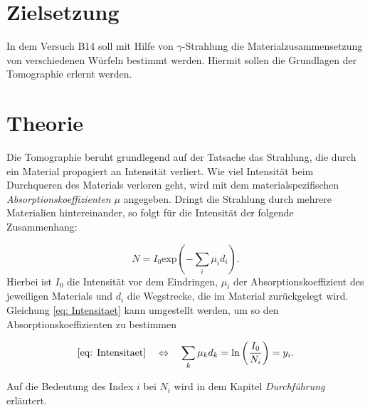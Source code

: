 \setcounter{page}{1}
\section*{Zielsetzung}

In dem Versuch B14 soll mit Hilfe von $\gamma$-Strahlung die
Materialzusammensetzung von verschiedenen Würfeln bestimmt werden.
Hiermit sollen die Grundlagen der Tomographie erlernt werden.

\section{Theorie}

Die Tomographie beruht grundlegend auf der Tatsache das Strahlung, die
durch ein Material propagiert an Intensität verliert.
Wie viel Intensität beim Durchqueren des Materials verloren geht, wird
mit dem materialspezifischen \emph{Absorptionskoeffizienten} $\mu$ angegeben.
Dringt die Strahlung durch mehrere Materialien hintereinander, so
folgt für die Intensität der folgende Zusammenhang:

\begin{equation}
  \label{eq: Intensitaet}
  N=I_0 \mathrm{exp}\left( - \sum_i \mu_i d_i \right).
\end{equation}
Hierbei ist $I_0$ die Intensität vor dem Eindringen, $\mu_i$ der
Absorptionskoeffizient des jeweiligen Materials und $d_i$ die
Wegstrecke, die im Material zurückgelegt wird.
Gleichung \eqref{eq: Intensitaet} kann umgestellt werden, um so den Absorptionskoeffizienten zu bestimmen

\begin{equation}
  \label{eq: I_umge}
  \eqref{eq: Intensitaet} \quad \Leftrightarrow \quad  \sum_k \mu_k d_k = \ln\left( \frac{ I_0}{N_i} \right)=y_i.
\end{equation}

Auf die Bedeutung des Index $i$ bei $N_i$ wird in dem Kapitel \emph{Durchführung} erläutert.
